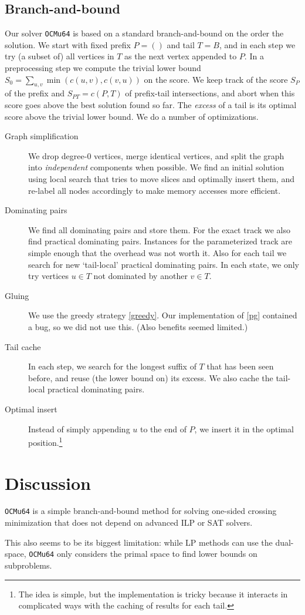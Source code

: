 \documentclass[a4paper,UKenglish,cleveref, autoref, thm-restate]{lipics-v2021}
\begin{document}
\subsection{Branch-and-bound}
Our solver \texttt{OCMu64} is based on a standard branch-and-bound on the order the solution.
We start with fixed prefix $P=()$ and tail $T=B$, and in each step we try (a
subset of) all vertices in $T$ as the next vertex appended to $P$.
In a preprocessing step we compute the trivial lower bound $S_0 =
\sum_{u,v}\min(c(u,v),c(v,u))$ on the score.
We keep track of the score $S_P$ of the prefix and $S_{PT}=c(P, T)$ of
prefix-tail intersections, and abort when this score goes above the best
solution found so far. The \emph{excess} of a tail is its optimal score above
the trivial lower bound. We do a number of optimizations.

\begin{description}
  \item[Graph simplification] We drop degree-$0$ vertices, merge identical
    vertices, and split the graph into \emph{independent} components when
    possible. We find an initial solution using local search that tries to move
    slices and optimally insert them, and re-label all nodes accordingly to make
    memory accesses more efficient.
  \item[Dominating pairs] We find all dominating pairs and store them. For the
    exact track we also find practical dominating pairs. Instances for the parameterized
    track are simple enough that the overhead was not worth it. Also for each
    tail we search for new `tail-local' practical dominating pairs. In each state, we only
    try vertices $u\in T$ not dominated by another $v\in T$.
  \item[Gluing] We use the greedy strategy \cref{greedy}. Our implementation
    of \cref{pg} contained a bug, so we did not use this. (Also benefits
    seemed limited.)
  \item[Tail cache] In each step, we search for the longest suffix of $T$ that
    has been seen before, and reuse (the lower bound on) its excess. We also
    cache the tail-local practical dominating pairs.
  \item[Optimal insert] Instead of simply appending $u$ to the end of $P$, we
    insert it in the optimal position.\footnote{The idea is simple, but the
    implementation is tricky because it interacts in complicated ways with
    the caching of results for each tail.}
\end{description}

\section{Discussion}
\texttt{OCMu64} is a simple branch-and-bound method for solving one-sided
crossing minimization that does not depend on advanced ILP or SAT solvers.

This also seems to be its biggest limitation: while LP methods can use
the dual-space, \texttt{OCMu64} only considers the primal space to find lower
bounds on subproblems.
\end{document}
